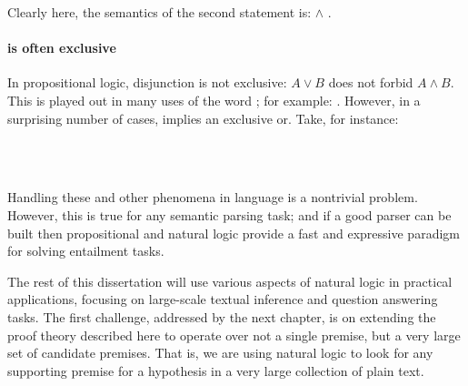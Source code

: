 Clearly here, the semantics of the second statement is: 
   $\land$ .


\paragraph{ is often exclusive}
In propositional logic, disjunction is not exclusive: $A \lor B$ does not
  forbid $A \land B$.
This is played out in many uses of the word ; for example:
  .
However, in a surprising number of cases,  implies an exclusive or.
Take, for instance:

\begin{displayquote}
 \\
 \\
\end{displayquote}

Handling these and other phenomena in language is a nontrivial problem.
However, this is true for any semantic parsing task; and if a good parser can be built
  then propositional and natural logic provide a fast and expressive paradigm for solving
  entailment tasks.

The rest of this dissertation will use various aspects of natural logic in practical applications,
  focusing on large-scale textual inference and question answering tasks.
The first challenge, addressed by the next chapter, is on extending the proof theory described
  here to operate over not a single premise, but a very large set of candidate premises.
That is, we are using natural logic to look for any supporting premise for a hypothesis 
  in a very large collection of plain text.


